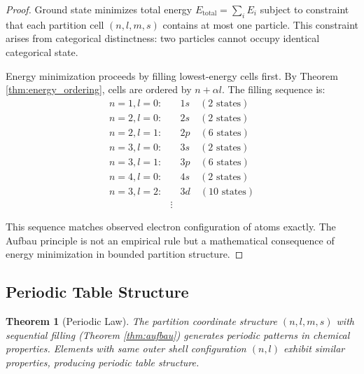 \documentclass[twocolumn,10pt]{article}
\newtheorem{theorem}{Theorem}[section]
\begin{document}
\begin{proof}
Ground state minimizes total energy $E_{\text{total}} = \sum_i E_i$ subject to constraint that each partition cell $(n,l,m,s)$ contains at most one particle. This constraint arises from categorical distinctness: two particles cannot occupy identical categorical state.

Energy minimization proceeds by filling lowest-energy cells first. By Theorem \ref{thm:energy_ordering}, cells are ordered by $n + \alpha l$. The filling sequence is:
\begin{align}
n=1, l=0: & \quad 1s \quad (2 \text{ states}) \\
n=2, l=0: & \quad 2s \quad (2 \text{ states}) \\
n=2, l=1: & \quad 2p \quad (6 \text{ states}) \\
n=3, l=0: & \quad 3s \quad (2 \text{ states}) \\
n=3, l=1: & \quad 3p \quad (6 \text{ states}) \\
n=4, l=0: & \quad 4s \quad (2 \text{ states}) \\
n=3, l=2: & \quad 3d \quad (10 \text{ states}) \\
& \vdots
\end{align}

This sequence matches observed electron configuration of atoms exactly. The Aufbau principle is not an empirical rule but a mathematical consequence of energy minimization in bounded partition structure.
\end{proof}

\subsection{Periodic Table Structure}

\begin{theorem}[Periodic Law]
\label{thm:periodic_law}
The partition coordinate structure $(n,l,m,s)$ with sequential filling (Theorem \ref{thm:aufbau}) generates periodic patterns in chemical properties. Elements with same outer shell configuration $(n,l)$ exhibit similar properties, producing periodic table structure.
\end{theorem}
\end{document}
